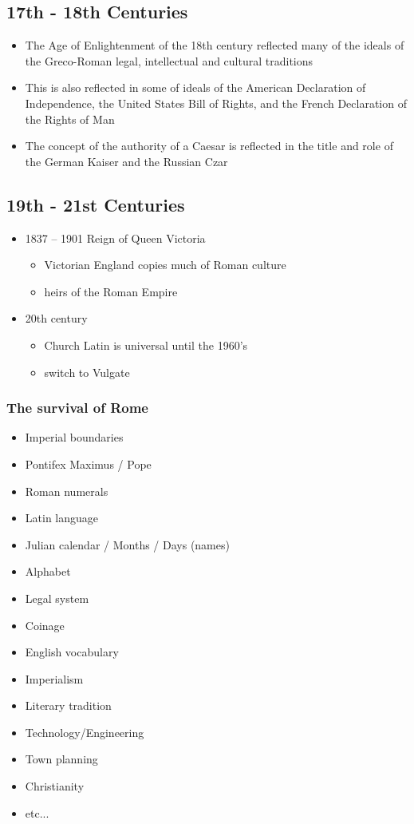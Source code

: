 \documentclass[12pt, twoside]{article}
\begin{document}
\subsection{17th - 18th Centuries}
\begin{itemize}
\item The Age of Enlightenment of the 18th century reflected many of the ideals of the Greco-Roman legal, intellectual and cultural traditions
\item This is also reflected in some of ideals of the American Declaration of Independence, the United States Bill of Rights, and the French Declaration of the Rights of Man
\item The concept of the authority of a Caesar is reflected in the title and role of the German Kaiser and the Russian Czar
\end{itemize}

\subsection{19th - 21st Centuries}
\begin{itemize}
\item 1837 – 1901 Reign of Queen Victoria
	\begin{itemize}
	\item Victorian England copies much of Roman culture
	\item heirs of the Roman Empire
	\end{itemize}
\item 20th century
	\begin{itemize}
	\item Church Latin is universal until the 1960’s
	\item switch to Vulgate
	\end{itemize}
\end{itemize}

\subsubsection{The survival of Rome}
\begin{itemize}
\item Imperial boundaries
\item Pontifex Maximus / Pope
\item Roman numerals
\item Latin language
\item Julian calendar / Months / Days (names)
\item Alphabet
\item Legal system
\item Coinage
\item English vocabulary
\item Imperialism
\item Literary tradition
\item Technology/Engineering
\item Town planning
\item Christianity
\item etc...
\end{itemize}
\end{document}
